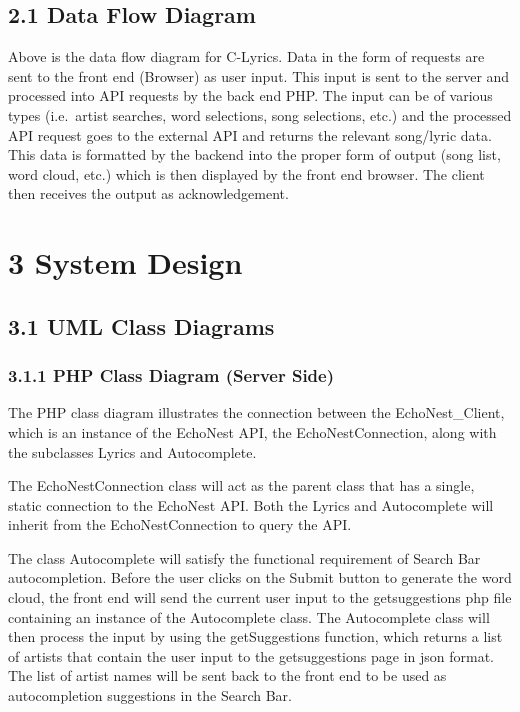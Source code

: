 \documentclass[]{article}
\begin{document}
\subsection{2.1 Data Flow Diagram}\label{data-flow-diagram}

Above is the data flow diagram for C-Lyrics. Data in the form of
requests are sent to the front end (Browser) as user input. This input
is sent to the server and processed into API requests by the back end
PHP. The input can be of various types (i.e.~artist searches, word
selections, song selections, etc.) and the processed API request goes to
the external API and returns the relevant song/lyric data. This data is
formatted by the backend into the proper form of output (song list, word
cloud, etc.) which is then displayed by the front end browser. The
client then receives the output as acknowledgement.

\section{3 System Design}\label{system-design}

\subsection{3.1 UML Class Diagrams}\label{uml-class-diagrams}

\subsubsection{3.1.1 PHP Class Diagram (Server
Side)}\label{php-class-diagram-server-side}

The PHP class diagram illustrates the connection between the
EchoNest\_Client, which is an instance of the EchoNest API, the
EchoNestConnection, along with the subclasses Lyrics and Autocomplete.

The EchoNestConnection class will act as the parent class that has a
single, static connection to the EchoNest API. Both the Lyrics and
Autocomplete will inherit from the EchoNestConnection to query the API.

The class Autocomplete will satisfy the functional requirement of Search
Bar autocompletion. Before the user clicks on the Submit button to
generate the word cloud, the front end will send the current user input
to the getsuggestions php file containing an instance of the
Autocomplete class. The Autocomplete class will then process the input
by using the getSuggestions function, which returns a list of artists
that contain the user input to the getsuggestions page in json format.
The list of artist names will be sent back to the front end to be used
as autocompletion suggestions in the Search Bar.
\end{document}
